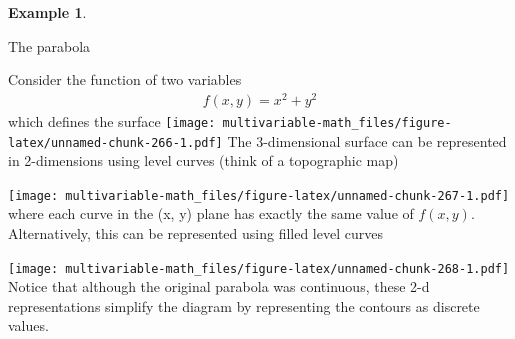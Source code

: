 \documentclass[
]{book}
\newenvironment{Shaded}{\begin{snugshade}}{\end{snugshade}}
\newcommand{\DataTypeTok}[1]{\textcolor[rgb]{0.13,0.29,0.53}{#1}}
\newcommand{\DecValTok}[1]{\textcolor[rgb]{0.00,0.00,0.81}{#1}}
\newcommand{\KeywordTok}[1]{\textcolor[rgb]{0.13,0.29,0.53}{\textbf{#1}}}
\newcommand{\NormalTok}[1]{#1}
\newcommand{\OperatorTok}[1]{\textcolor[rgb]{0.81,0.36,0.00}{\textbf{#1}}}
\newcommand{\StringTok}[1]{\textcolor[rgb]{0.31,0.60,0.02}{#1}}
\theoremstyle{definition}
\theoremstyle{definition}
\newtheorem{example}{Example}[chapter]
\theoremstyle{definition}
\theoremstyle{remark}
\begin{document}
\begin{example}
\protect\hypertarget{exm:unlabeled-div-202}{}\label{exm:unlabeled-div-202}

The parabola

Consider the function of two variables
\[
\begin{aligned}
f(x, y) = x^2 + y^2
\end{aligned}
\]
which defines the surface
\texttt{[image: multivariable-math\_files/figure-latex/unnamed-chunk-266-1.pdf]}
The 3-dimensional surface can be represented in 2-dimensions using level curves (think of a topographic map)

\begin{Shaded}
\end{Shaded}

\texttt{[image: multivariable-math\_files/figure-latex/unnamed-chunk-267-1.pdf]}
where each curve in the (x, y) plane has exactly the same value of \(f(x, y)\). Alternatively, this can be represented using filled level curves

\begin{Shaded}
\end{Shaded}

\texttt{[image: multivariable-math\_files/figure-latex/unnamed-chunk-268-1.pdf]}
Notice that although the original parabola was continuous, these 2-d representations simplify the diagram by representing the contours as discrete values.

\end{example}
\end{document}
